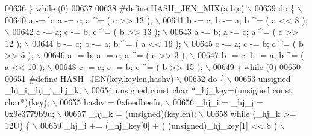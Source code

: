 \begin{DoxyCode}
{{{{{{{{00636 \textcolor{preprocessor}{\} while (0)}
00637 
00638 \textcolor{preprocessor}{#define HASH\_JEN\_MIX(a,b,c)                                                      \(\backslash\)}
00639 \textcolor{preprocessor}{do \{                                                                             \(\backslash\)}
00640 \textcolor{preprocessor}{  a -= b; a -= c; a ^= ( c >> 13 );                                              \(\backslash\)}
00641 \textcolor{preprocessor}{  b -= c; b -= a; b ^= ( a << 8 );                                               \(\backslash\)}
00642 \textcolor{preprocessor}{  c -= a; c -= b; c ^= ( b >> 13 );                                              \(\backslash\)}
00643 \textcolor{preprocessor}{  a -= b; a -= c; a ^= ( c >> 12 );                                              \(\backslash\)}
00644 \textcolor{preprocessor}{  b -= c; b -= a; b ^= ( a << 16 );                                              \(\backslash\)}
00645 \textcolor{preprocessor}{  c -= a; c -= b; c ^= ( b >> 5 );                                               \(\backslash\)}
00646 \textcolor{preprocessor}{  a -= b; a -= c; a ^= ( c >> 3 );                                               \(\backslash\)}
00647 \textcolor{preprocessor}{  b -= c; b -= a; b ^= ( a << 10 );                                              \(\backslash\)}
00648 \textcolor{preprocessor}{  c -= a; c -= b; c ^= ( b >> 15 );                                              \(\backslash\)}
00649 \textcolor{preprocessor}{\} while (0)}
00650 
00651 \textcolor{preprocessor}{#define HASH\_JEN(key,keylen,hashv)                                               \(\backslash\)}
00652 \textcolor{preprocessor}{do \{                                                                             \(\backslash\)}
00653 \textcolor{preprocessor}{  unsigned \_hj\_i,\_hj\_j,\_hj\_k;                                                    \(\backslash\)}
00654 \textcolor{preprocessor}{  unsigned const char *\_hj\_key=(unsigned const char*)(key);                      \(\backslash\)}
00655 \textcolor{preprocessor}{  hashv = 0xfeedbeefu;                                                           \(\backslash\)}
00656 \textcolor{preprocessor}{  \_hj\_i = \_hj\_j = 0x9e3779b9u;                                                   \(\backslash\)}
00657 \textcolor{preprocessor}{  \_hj\_k = (unsigned)(keylen);                                                    \(\backslash\)}
00658 \textcolor{preprocessor}{  while (\_hj\_k >= 12U) \{                                                         \(\backslash\)}
00659 \textcolor{preprocessor}{    \_hj\_i +=    (\_hj\_key[0] + ( (unsigned)\_hj\_key[1] << 8 )                      \(\backslash\)}
}}}}}}}}
\end{DoxyCode}

